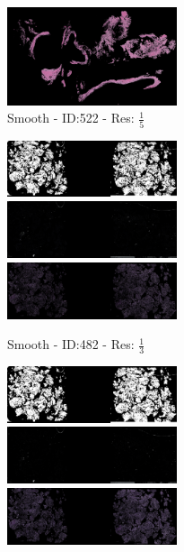 \documentclass[a4paper,10pt,oneside]{article}
\begin{document}
\begin{figure}[hbtp]
\begin{subfigure}[b]{5cm}
    \includegraphics[width=5cm]{visualization/results/smoothhistogram/res_reduce_5/Region_1_PO13-00522A1_1_2_201305171639.png}
    \caption{Smooth - ID:522 - Res: $\frac{1}{5}$}
  \end{subfigure}
  \begin{subfigure}[b]{5cm}
    \includegraphics[width=5cm]{visualization/results/smoothhistogram/res_reduce_3/Region_0_PO14-00482B3_1_2_201404171123.png}
    \includegraphics[width=5cm]{visualization/results/smoothhistogram/res_reduce_3/Region_1_PO14-00482B3_1_2_201404171123.png}
    \includegraphics[width=5cm]{visualization/results/smoothhistogram/res_reduce_3/Region_2_PO14-00482B3_1_2_201404171123.png}
    \caption{Smooth - ID:482 - Res: $\frac{1}{3}$}
  \end{subfigure}
  \begin{subfigure}[b]{5cm}
    \includegraphics[width=5cm]{visualization/results/smoothhistogram/res_reduce_4/Region_0_PO14-00482B3_1_2_201404171123.png}
    \includegraphics[width=5cm]{visualization/results/smoothhistogram/res_reduce_4/Region_1_PO14-00482B3_1_2_201404171123.png}
    \includegraphics[width=5cm]{visualization/results/smoothhistogram/res_reduce_4/Region_2_PO14-00482B3_1_2_201404171123.png}

\end{subfigure}
\end{figure}
\end{document}
